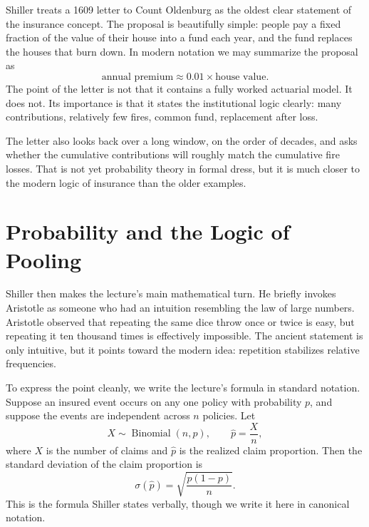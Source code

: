 Shiller treats a 1609 letter to Count Oldenburg as the oldest clear statement of the insurance concept. The proposal is beautifully simple: people pay a fixed fraction of the value of their house into a fund each year, and the fund replaces the houses that burn down. In modern notation we may summarize the proposal as
\begin{equation}
\text{annual premium} \approx 0.01 \times \text{house value}.
\end{equation}
The point of the letter is not that it contains a fully worked actuarial model. It does not. Its importance is that it states the institutional logic clearly: many contributions, relatively few fires, common fund, replacement after loss.

The letter also looks back over a long window, on the order of decades, and asks whether the cumulative contributions will roughly match the cumulative fire losses. That is not yet probability theory in formal dress, but it is much closer to the modern logic of insurance than the older examples.

\section{Probability and the Logic of Pooling}

Shiller then makes the lecture's main mathematical turn. He briefly invokes Aristotle as someone who had an intuition resembling the law of large numbers. Aristotle observed that repeating the same dice throw once or twice is easy, but repeating it ten thousand times is effectively impossible. The ancient statement is only intuitive, but it points toward the modern idea: repetition stabilizes relative frequencies.

To express the point cleanly, we write the lecture's formula in standard notation. Suppose an insured event occurs on any one policy with probability \(p\), and suppose the events are independent across \(n\) policies. Let
\begin{equation}
X \sim \operatorname{Binomial}(n,p), \qquad \hat p = \frac{X}{n},
\end{equation}
where \(X\) is the number of claims and \(\hat p\) is the realized claim proportion. Then the standard deviation of the claim proportion is
\begin{equation}
\sigma(\hat p)=\sqrt{\frac{p(1-p)}{n}}.
\end{equation}
This is the formula Shiller states verbally, though we write it here in canonical notation.

